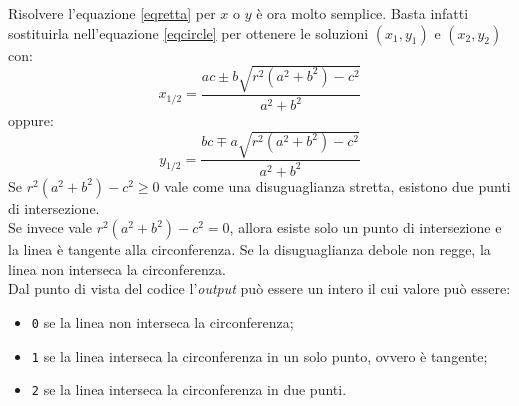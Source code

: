 Risolvere l'equazione \ref{eqretta} per $x$ o $y$ è ora molto semplice. Basta infatti sostituirla nell'equazione \ref{eqcircle} per ottenere le soluzioni $(x_1, y_1)$ e $(x_2, y_2)$ con:
\begin{equation}
x_{1/2} = \frac{ac \pm b \sqrt{r^2 (a^2 + b^2)-c^2}}{a ^ 2 + b ^ 2}
\end{equation}
oppure:
\begin{equation}
y_{1/2} = \frac{bc \mp a \sqrt{r^2 (a^2 + b^2)-c^2}}{a ^ 2 + b ^ 2}
\end{equation}
Se $r^2 (a^2 + b^2)-c^2 \geq 0$ vale come una disuguaglianza stretta, esistono due punti di intersezione.\\
Se invece vale $r^2 (a^2 + b^2)-c^2 = 0$, allora esiste solo un punto di intersezione e la linea è tangente alla circonferenza. Se la disuguaglianza debole non regge, la linea non interseca la circonferenza.\\
\noindent
Dal punto di vista del codice l'\textit{output} può essere un intero il cui valore può essere:
\begin{itemize}
	\item \texttt{0} se la linea non interseca la circonferenza;
	\item \texttt{1} se la linea interseca la circonferenza in un solo punto, ovvero è tangente;
	\item \texttt{2} se la linea interseca la circonferenza in due punti.
\end{itemize}

